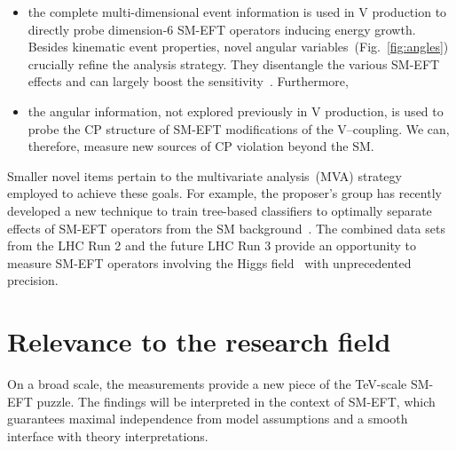 \documentclass[a4paper,11pt]{article}
\newcommand{\Pb}{{{\Pqb}}\xspace}
\newcommand{\PAb}{{{{\Paqb}}}\xspace}
\renewcommand{\PV}{{{{V}}}\xspace}
\newcommand{\VH}{{{\PV}{\PH}}\xspace}
\begin{document}
\begin{itemize}

\item the complete multi-dimensional event information is used in \VH production to directly probe dimension-6 SM-EFT operators inducing energy growth.
Besides kinematic event properties, novel angular variables~(Fig.~\ref{fig:angles}) crucially refine the analysis strategy. 
They disentangle the various SM-EFT effects and can largely boost the sensitivity~\cite{CMS-PAS-SMP-20-005}. Furthermore, %

\item the angular information, not explored previously in \VH production, is used to probe the CP structure of SM-EFT modifications of the \PV--\PH coupling. We can, therefore, measure new sources of CP violation beyond the SM.
\end{itemize}

Smaller novel items pertain to the multivariate analysis~(MVA) strategy employed to achieve these goals. 
For example, the proposer's group has recently developed a new technique to train tree-based classifiers to optimally separate effects of SM-EFT operators from the SM background~\cite{Chatterjee:2021nms}.
The combined data sets from the LHC Run 2 and the future LHC Run 3 provide an opportunity to measure SM-EFT operators involving the Higgs field~\cite{Elias-Miro:2013mua,Gupta:2014rxa} with unprecedented precision.

\section{Relevance to the research field}

On a broad scale, the measurements provide a new piece of the TeV-scale SM-EFT puzzle. 
The findings will be interpreted in the context of SM-EFT, which guarantees maximal independence from model assumptions and a smooth interface with theory interpretations.  
\end{document}
